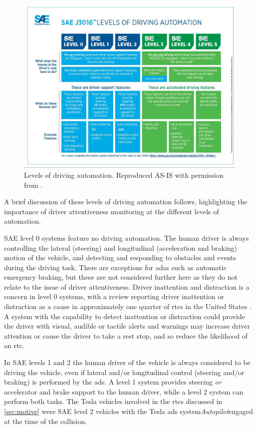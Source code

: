 \documentclass[11pt, parskip=half*,twoside=false]{scrbook}
\begin{document}
\begin{figure}[h]
	\centering
	\includegraphics[width=\textwidth]{sae_av_levels} 
	\caption{Levels of driving automation. Reproduced AS-IS with permission from \citet{J3016_201806}.}
	\label{fig:av_levels}
\end{figure}

A brief discussion of these levels of driving automation follows, highlighting the importance of driver attentiveness monitoring at the different levels of automation. 

SAE level 0 systems feature no driving automation. The human driver is always controlling the lateral (steering) and longitudinal (acceleration and braking) motion of the vehicle, and detecting and responding to obstacles and events during the driving task. There are exceptions for \gls{adas} such as automatic emergency braking, but these are not considered further here as they do not relate to the issue of driver attentiveness. Driver inattention and distraction is a concern in level 0 systems, with a review reporting driver inattention or distraction as a cause in approximately one quarter of \glspl{rtc} in the United States \citep{youngDriverDistraction2007}. A system with the capability to detect inattention or distraction could provide the driver with visual, audible or tactile alerts and warnings may increase driver attention or cause the driver to take a rest stop, and so reduce the likelihood of an \gls{rtc}.

In SAE levels 1 and 2 the human driver of the vehicle is always considered to be driving the vehicle, even if lateral and/or longitudinal control (steering and/or braking) is performed by the \gls{ads}. A level 1 system provides steering \emph{or} accelerator and brake support to the human driver, while a level 2 system can perform both tasks. The Tesla vehicles involved in the \glspl{rtc} discussed in \cref{sec:motive} were SAE level 2 vehicles with the Tesla \gls{ads} system\textemdash \emph{Autopilot}\textemdash engaged at the time of the collision. 
\end{document}

